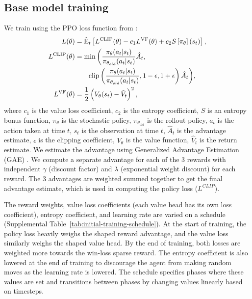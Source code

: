 \documentclass[conference]{IEEEtran}
\begin{document}
\subsection{Base model training}
We train using the PPO loss function from \cite{DBLP:journals/corr/SchulmanWDRK17}:
\begin{align}
    L(\theta) &= \hat{\mathbb{E}}_t \left[ L^{\text{CLIP}}(\theta) - c_1 L^{\text{VF}}(\theta) + c_2 S\left[\pi_\theta\right](s_t) \right], \\
    L^{\text{CLIP}}(\theta) &= \min \bigg( \frac{\pi_\theta(a_t|s_t)}{\pi_{\theta_{old}}(a_t|s_t)} \hat{A}_t, \notag \\
    &\qquad \text{clip}\left( \frac{\pi_\theta(a_t|s_t)}{\pi_{\theta_{old}}(a_t|s_t)}, 1-\epsilon, 1+\epsilon \right) \hat{A}_t \bigg), \\
    L^{\text{VF}}(\theta) &= \frac{1}{2} \left( V_\theta(s_t) - \hat{V}_t \right)^2,
\end{align}
where $c_1$ is the value loss coefficient, $c_2$ is the entropy coefficient, $S$ is an
entropy bonus function, $\pi_\theta$ is the stochastic policy, $\pi_{\theta_{old}}$ is the rollout policy, $a_t$
is the action taken at time $t$, $s_t$ is the observation at time $t$, $\hat{A}_t$
is the advantage estimate,  $\epsilon$ is the clipping coefficient, $V_\theta$ is the
value function, $\hat{V}_t$ is the return estimate. We estimate the advantage
using Generalized Advantage Estimation (GAE) \cite{DBLP:journals/corr/SchulmanMLJA15}.
We compute a separate advantage for each of the 3 rewards with independent $\gamma$
(discount factor) and $\lambda$ (exponential weight discount) for each reward. The 3 
advantages are weighted summed together to get the final advantage estimate, which is
used in computing the policy loss ($L^{CLIP}$).

The reward weights, value loss coefficients (each value
head has its own loss coefficient), entropy coefficient, and learning rate are varied on
a schedule (Supplemental Table~\ref{tab:initial-training-schedule}). At the start of training, the policy loss heavily weighs the shaped 
reward advantage, and the value loss similarly weighs the shaped value head. By the end
of training, both losses are weighted more towards the win-loss sparse reward. The entropy coefficient is also
lowered at the end of training to discourage the agent from making random moves as the
learning rate is lowered. The schedule specifies phases where these values are set and
transitions between phases by changing values linearly based on timesteps.
\end{document}
